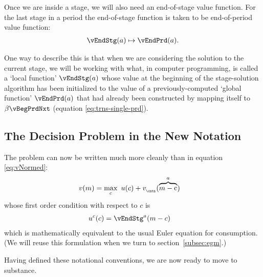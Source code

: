 \documentclass[titlepage, headings=optiontotocandhead]{Resources/texmf-local/tex/latex/econtex}
\begin{document}
Once we are inside a {stage}, we will also need an end-of-{stage} value function.  For the last {stage} in a {period} the end-of-{stage} function is taken to be end-of-{period} value function:
  \begin{equation}\begin{gathered}\begin{aligned}
        \vEndStg(a) \mapsto \vEndPrd(a).
      \end{aligned}\end{gathered}\end{equation}

One way to describe this is that when we are considering the solution to the current {stage}, we will be working with what, in computer programming, is called a `local function' $\vEndStg(a)$ whose value at the beginning of the {stage}-solution algorithm has been initialized to the value of a previously-computed `global function' $\vEndPrd(a)$ that had already been constructed by mapping itself to $\beta \vBegPrdNxt$ (equation \eqref{eq:trns-single-prd}).
\hypertarget{decision-problem}{}

\subsection{The Decision Problem in the New Notation}\label{subsec:decision-problem}

The {\Decision} problem can now be written much more cleanly than in equation \eqref{eq:vNormed}:
  \begin{equation}\begin{gathered}\begin{aligned}
        v(m) & = \max_{c}~ u(c) + v_{_\cntn}(\overbrace{m-\mathrm{c}}^{a}) \label{eq:vMid}
      \end{aligned}\end{gathered}\end{equation}
whose first order condition with respect to $c$ is
\begin{equation}\begin{gathered}\begin{aligned}
  u^{c}(c) &= \vEndStg^{a}(m-c)  \label{eq:upEqbetaOp} 
\end{aligned}\end{gathered}\end{equation}
which is mathematically equivalent to the usual Euler equation for consumption.  (We will reuse this formulation when we turn to section~\ref{subsec:egm}.)

Having defined these notational conventions, we are now ready to move to substance.
\end{document}
